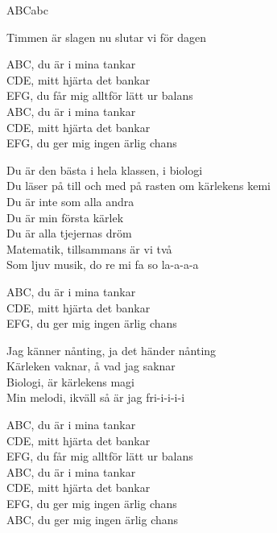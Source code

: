 \begin{song}{ABC}{abc}
\begin{vers}
Timmen är slagen nu slutar vi för dagen\\
\end{vers}
\begin{vers}
ABC, du är i mina tankar\\
CDE, mitt hjärta det bankar\\
EFG, du får mig alltför lätt ur balans\\
ABC, du är i mina tankar\\
CDE, mitt hjärta det bankar\\
EFG, du ger mig ingen ärlig chans\\
\end{vers}
\begin{vers}
Du är den bästa i hela klassen, i biologi\\
Du läser på till och med på rasten om kärlekens kemi\\
Du är inte som alla andra\\
Du är min första kärlek\\
Du är alla tjejernas dröm\\
Matematik, tillsammans är vi två\\
Som ljuv musik, do re mi fa so la-a-a-a\\
\end{vers}
\begin{vers}
ABC, du är i mina tankar\\
CDE, mitt hjärta det bankar\\
EFG, du ger mig ingen ärlig chans\\
\end{vers}
\begin{vers}
Jag känner nånting, ja det händer nånting\\
Kärleken vaknar, å vad jag saknar\\
Biologi, är kärlekens magi\\
Min melodi, ikväll så är jag fri-i-i-i-i\\
\end{vers}
\begin{vers}
ABC, du är i mina tankar\\
CDE, mitt hjärta det bankar\\
EFG, du får mig alltför lätt ur balans\\
ABC, du är i mina tankar\\
CDE, mitt hjärta det bankar\\
EFG, du ger mig ingen ärlig chans\\
ABC, du ger mig ingen ärlig chans\\
\end{vers}
\end{song}
